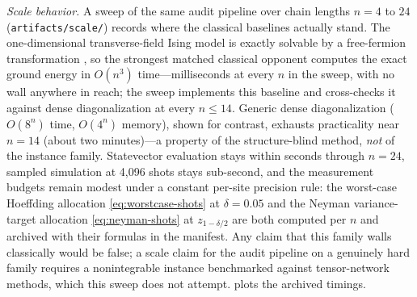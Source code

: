 \emph{Scale behavior.} A sweep of the same audit pipeline over chain lengths $n=4$ to $24$ (\texttt{artifacts/scale/}) records where the classical baselines actually stand. The one-dimensional transverse-field Ising model is exactly solvable by a free-fermion transformation \citep{pfeuty1970}, so the strongest matched classical opponent computes the exact ground energy in $O(n^{3})$ time---milliseconds at every $n$ in the sweep, with no wall anywhere in reach; the sweep implements this baseline and cross-checks it against dense diagonalization at every $n\leq14$. Generic dense diagonalization ($O(8^{n})$ time, $O(4^{n})$ memory), shown for contrast, exhausts practicality near $n=14$ (about two minutes)---a property of the structure-blind method, \emph{not} of the instance family. Statevector evaluation stays within seconds through $n=24$, sampled simulation at 4{,}096 shots stays sub-second, and the measurement budgets remain modest under a constant per-site precision rule: the worst-case Hoeffding allocation \eqref{eq:worstcase-shots} at $\delta=0.05$ and the Neyman variance-target allocation \eqref{eq:neyman-shots} at $z_{1-\delta/2}$ are both computed per $n$ and archived with their formulas in the manifest. Any claim that this family walls classically would be false; a scale claim for the audit pipeline on a genuinely hard family requires a nonintegrable instance benchmarked against tensor-network methods, which this sweep does not attempt.  plots the archived timings.

